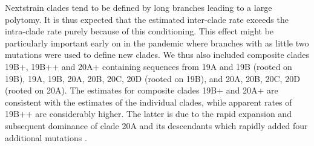 \documentclass[aps,rmp, twocolumn]{revtex4}
\begin{document}
Nextstrain clades tend to be defined by long branches leading to a large polytomy.
It is thus expected that the estimated inter-clade rate exceeds the intra-clade rate purely because of this conditioning.
This effect might be particularly important early on in the pandemic where branches with as little two mutations were used to define new clades.
We thus also included composite clades 19B+, 19B++ and 20A+ containing sequences from 19A and 19B (rooted on 19B), 19A, 19B, 20A, 20B, 20C, 20D (rooted on 19B), and 20A, 20B, 20C, 20D (rooted on 20A).
The estimates for composite clades 19B+ and 20A+ are consistent with the estimates of the individual clades, while apparent rates of 19B++ are considerably higher.
The latter is due to the rapid expansion and subsequent dominance of clade 20A and its descendants which rapidly added four additional mutations \citep{korber_tracking_2020}.
\end{document}
